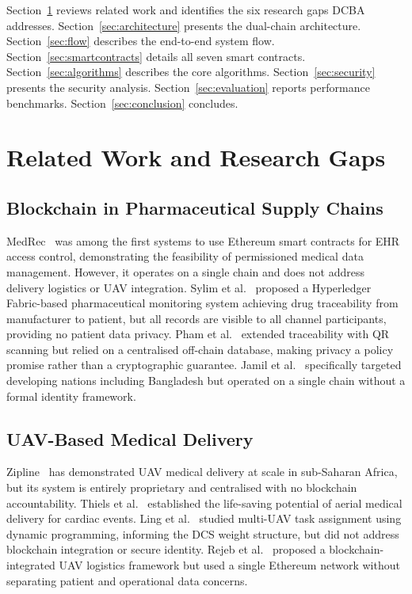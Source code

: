 \documentclass[sigplan,screen,review=false]{acmart}
\begin{document}
Section~\ref{sec:related} reviews related work and identifies the six
research gaps DCBA addresses. Section~\ref{sec:architecture} presents
the dual-chain architecture. Section~\ref{sec:flow} describes the
end-to-end system flow. Section~\ref{sec:smartcontracts} details all
seven smart contracts. Section~\ref{sec:algorithms} describes the core
algorithms. Section~\ref{sec:security} presents the security analysis.
Section~\ref{sec:evaluation} reports performance benchmarks.
Section~\ref{sec:conclusion} concludes.

\section{Related Work and Research Gaps}
\label{sec:related}

\subsection{Blockchain in Pharmaceutical Supply Chains}

MedRec~\cite{azaria2016medrec} was among the first systems to use
Ethereum smart contracts for EHR access control, demonstrating the
feasibility of permissioned medical data management. However, it
operates on a single chain and does not address delivery logistics or
UAV integration. Sylim et al.~\cite{sylim2018blockchain} proposed a
Hyperledger Fabric-based pharmaceutical monitoring system achieving drug
traceability from manufacturer to patient, but all records are visible
to all channel participants, providing no patient data privacy. Pham
et al.~\cite{pham2019blockchain} extended traceability with QR scanning
but relied on a centralised off-chain database, making privacy a policy
promise rather than a cryptographic guarantee. Jamil et
al.~\cite{jamil2021blockchain} specifically targeted developing nations
including Bangladesh but operated on a single chain without a formal
identity framework.

\subsection{UAV-Based Medical Delivery}

Zipline~\cite{zipline2022report} has demonstrated UAV medical delivery
at scale in sub-Saharan Africa, but its system is entirely proprietary
and centralised with no blockchain accountability. Thiels et
al.~\cite{thiels2015uav} established the life-saving potential of aerial
medical delivery for cardiac events. Ling et al.~\cite{ling2019task}
studied multi-UAV task assignment using dynamic programming, informing
the DCS weight structure, but did not address blockchain integration or
secure identity. Rejeb et al.~\cite{rejeb2022drone} proposed a
blockchain-integrated UAV logistics framework but used a single Ethereum
network without separating patient and operational data concerns.
\end{document}
